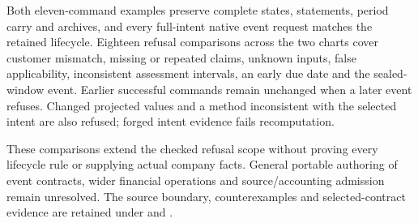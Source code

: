 Both eleven-command examples preserve complete states, statements, period
carry and archives, and every full-intent native event request matches the
retained lifecycle. Eighteen refusal comparisons across the two charts cover
customer mismatch, missing or repeated claims, unknown inputs, false
applicability, inconsistent assessment intervals, an early due date and the
sealed-window event. Earlier successful commands remain unchanged when a later
event refuses. Changed projected values and a method inconsistent with the
selected intent are also refused; forged intent evidence fails recomputation.

These comparisons extend the checked refusal scope without proving every
lifecycle rule or supplying actual company facts. General portable authoring
of event contracts, wider financial operations and source/accounting admission
remain unresolved. The source boundary, counterexamples and selected-contract
evidence are retained under
 and
.
